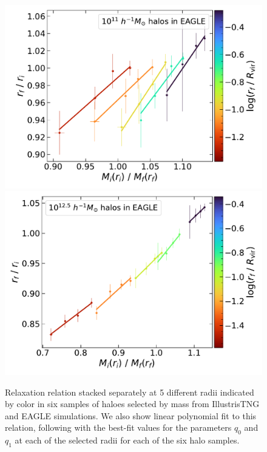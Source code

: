 \begin{figure}
    \includegraphics[width=0.48\linewidth]{plots/fit_show_rf_M_E25_M11.pdf}
    \includegraphics[width=0.48\linewidth]{plots/fit_show_rf_M_E100_M12.5.pdf}
    \caption{Relaxation relation stacked separately at 5 different radii indicated by color in six samples of haloes selected by mass from IllustrisTNG and EAGLE simulations. We also show linear polynomial fit to this relation, following  with the best-fit values for the parameters $q_0$ and $q_1$ at each of the selected radii for each of the six halo samples.} %
    \label{fig:rf-fit-show-ch:simbase}
\end{figure}

